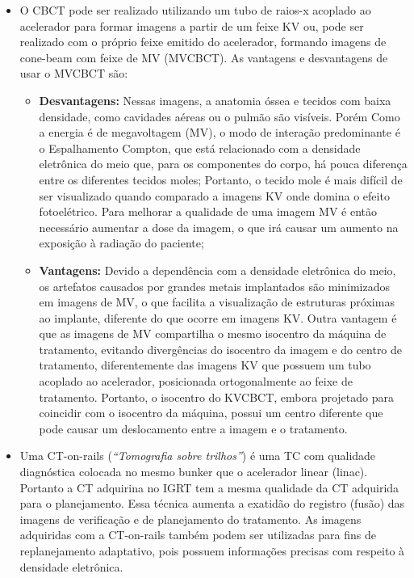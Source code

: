 \documentclass[11pt,a4paper]{article}
\newcounter{exemplo}
\begin{document}
\begin{exemplo}[IGRT]
\begin{itemize}
        \item O CBCT pode ser realizado utilizando um tubo de raios-x acoplado ao acelerador para formar imagens a partir de um feixe KV ou, pode ser realizado com o próprio feixe emitido do acelerador, formando imagens de cone-beam com feixe de MV (MVCBCT). As vantagens e desvantagens de usar o MVCBCT são:
            \begin{itemize}[label=\textcolor{CarnationPink}{$\blacktriangleright$}]
                \item \textbf{Desvantagens:} Nessas imagens, a anatomia óssea e tecidos com baixa densidade, como cavidades aéreas ou o pulmão são visíveis. Porém Como a energia é de megavoltagem (MV), o modo de interação predominante é o Espalhamento Compton, que está relacionado com a densidade eletrônica do meio que, para os componentes do corpo, há pouca diferença entre os diferentes tecidos moles; Portanto, o tecido mole é mais difícil de ser visualizado quando comparado a imagens KV onde domina o efeito fotoelétrico. Para melhorar a qualidade de uma imagem MV é então necessário aumentar a dose da imagem, o que irá causar um aumento na exposição à radiação do paciente;
                
                \item \textbf{Vantagens:} Devido a dependência com a densidade eletrônica do meio, os artefatos causados por grandes metais implantados são minimizados em imagens de MV, o que facilita a visualização de estruturas próximas ao implante, diferente do que ocorre em imagens KV. Outra vantagem é que as imagens de MV compartilha o mesmo isocentro da máquina de tratamento, evitando divergências do isocentro da imagem e do centro de tratamento, diferentemente das imagens KV que possuem um tubo acoplado ao acelerador, posicionada ortogonalmente ao feixe de tratamento. Portanto, o isocentro do KVCBCT, embora projetado para coincidir com o isocentro da máquina, possui um centro diferente que pode causar um deslocamento entre a imagem e o tratamento. 
            \end{itemize}
        
        \item Uma CT-on-rails (\textit{``Tomografia sobre trilhos''}) é uma TC com qualidade diagnóstica colocada no mesmo bunker que o acelerador linear (linac). Portanto a CT adquirina no IGRT tem a mesma qualidade da CT adquirida para o planejamento. Essa técnica aumenta a exatidão do registro (fusão) das imagens de verificação e de planejamento do tratamento. As imagens adquiridas com a CT-on-rails também podem ser utilizadas para fins de replanejamento adaptativo, pois possuem informações precisas com respeito à densidade eletrônica.
        

\end{itemize}
\end{exemplo}
\end{document}
